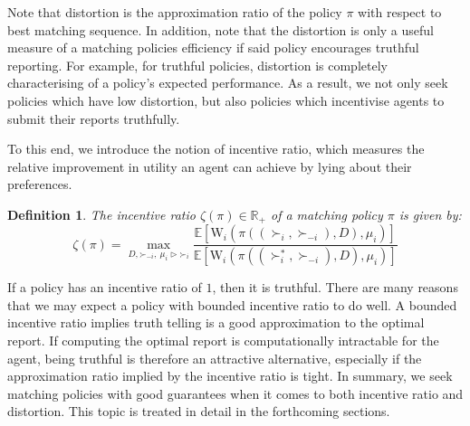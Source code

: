 \documentclass[letterpaper,11pt]{article}
\newtheorem{defn}{Definition}
\begin{document}
    Note that distortion is the approximation ratio of the policy $\pi$ with respect to best matching sequence. In addition, note that the distortion is only a useful measure of a matching policies efficiency if said policy encourages truthful reporting. For example, for truthful policies, distortion is completely characterising of a policy's expected performance. As a result, we not only seek policies which have low distortion, but also policies which incentivise agents to submit their reports truthfully.
    
    To this end, we introduce the notion of incentive ratio, which measures the relative improvement in utility an agent can achieve by lying about their preferences.
    
    \begin{defn}
        The incentive ratio $\zeta(\pi) \in \mathbb{R}_{+}$ of a matching policy $\pi$ is given by:
        \begin{equation*}
            \zeta(\pi) = \max_{D, \mathord{\succ}_{-i},\: \mu_{i} \rhd \mathord{\succ}_{i}} \frac{\mathbb{E}[\textrm{W}_{i}(\pi((\succ_{i}, \succ_{-i}), D), \mu_{i})]}{\mathbb{E}[\textrm{W}_{i}(\pi((\succ^{*}_{i}, \succ_{-i}), D), \mu_{i})]}
        \end{equation*}
    \end{defn}
    

If a policy has an incentive ratio of $1$, then it is truthful. There are many reasons that we may expect a policy with bounded incentive ratio to do well. A bounded incentive ratio implies truth telling is a good approximation to the optimal report. If computing the optimal report is computationally intractable for the agent, being truthful is therefore an attractive alternative, especially if the approximation ratio implied by the incentive ratio is tight. In summary, we seek matching policies with good guarantees when it comes to both incentive ratio and distortion. This topic is treated in detail in the forthcoming sections.
\end{document}
